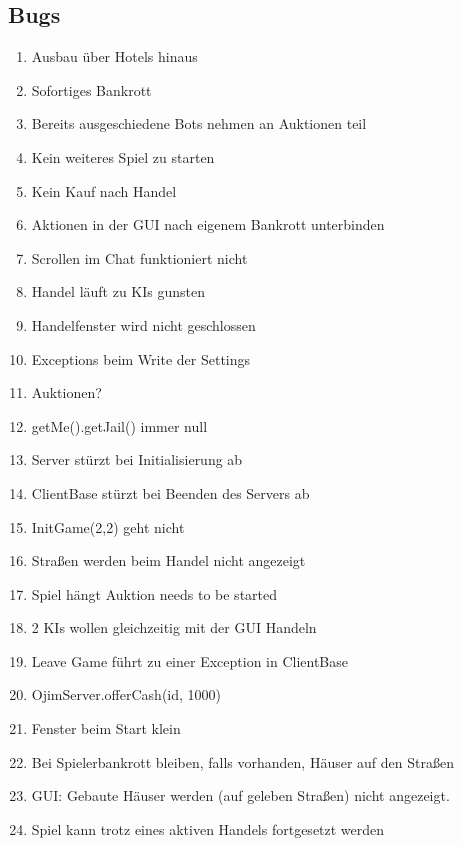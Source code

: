 \documentclass[a4paper,10pt]{article}
\begin{document}
\subsection{Bugs}
\begin{enumerate}
\item Ausbau über Hotels hinaus
\item Sofortiges Bankrott
\item Bereits ausgeschiedene Bots nehmen an Auktionen teil
\item Kein weiteres Spiel zu starten
\item Kein Kauf nach Handel
\item Aktionen in der GUI nach eigenem Bankrott unterbinden
\item Scrollen im Chat funktioniert nicht
\item Handel läuft zu KIs gunsten
\item Handelfenster wird nicht geschlossen
\item Exceptions beim Write der Settings
\item Auktionen?
\item getMe().getJail() immer null
\item Server stürzt bei Initialisierung ab
\item ClientBase stürzt bei Beenden des Servers ab
\item InitGame(2,2) geht nicht
\item Straßen werden beim Handel nicht angezeigt
\item Spiel hängt Auktion needs to be started
\item 2 KIs wollen gleichzeitig mit der GUI Handeln
\item Leave Game führt zu einer Exception in ClientBase
\item OjimServer.offerCash(id, 1000)
\item Fenster beim Start klein
\item Bei Spielerbankrott bleiben, falls vorhanden, Häuser auf den Straßen
\item GUI: Gebaute Häuser werden (auf geleben Straßen) nicht angezeigt.
\item Spiel kann trotz eines aktiven Handels fortgesetzt werden
\end{enumerate}
\end{document}

